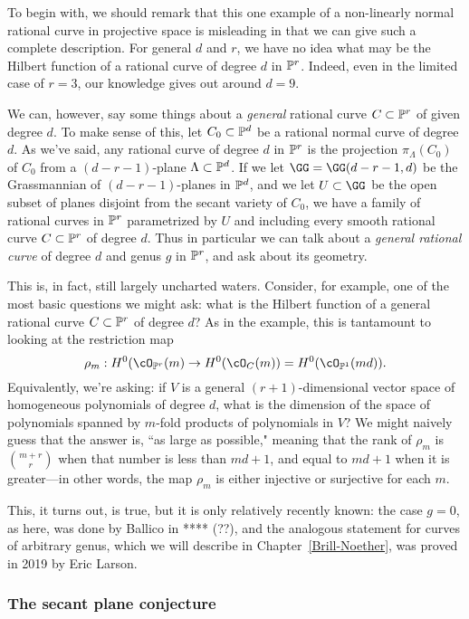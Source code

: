 To begin with, we should remark that this one example of a non-linearly normal rational curve in projective space is misleading in that we can give such a complete description. For general $d$ and $r$, we have no idea what may be the Hilbert function of a rational curve of degree $d$ in $\PP^r$. Indeed, even in the limited case of $r=3$, our knowledge gives out around $d=9$.

We can, however, say some things about a \emph{general} rational curve $C \subset \PP^r$ of given degree $d$. To make sense of this, let $C_0 \subset \PP^d$ be a rational normal curve of degree $d$. As we've said, any rational curve of degree $d$ in $\PP^r$ is the projection $\pi_\Lambda(C_0)$ of $C_0$ from a $(d-r-1)$-plane $\Lambda \subset \PP^d$. If we let $\GG = \GG(d-r-1, d)$ be the Grassmannian of $(d-r-1)$-planes in $\PP^d$, and we let $U \subset \GG$ be the open subset of planes disjoint from the secant variety of $C_0$, we have a family of rational curves in $\PP^r$ parametrized by $U$ and including every smooth rational curve $C \subset \PP^r$ of degree $d$. Thus in particular we can talk about a \emph{general rational curve} of degree $d$ and genus $g$ in $\PP^r$, and ask about its geometry.

This is, in fact, still largely uncharted waters. Consider, for example, one of the most basic questions we might ask: what is the Hilbert function of a general rational curve $C \subset \PP^r$ of degree $d$? As in the example, this is tantamount to looking at the restriction map
$$
\rho_m : H^0(\cO_{\PP^r}(m) \to H^0(\cO_C(m)) = H^0(\cO_{\PP^1}(md)).
$$
Equivalently, we're asking: if $V$ is a general  $(r+1)$-dimensional vector space of homogeneous polynomials of degree $d$, what is the dimension of the space of polynomials spanned by $m$-fold products of polynomials in $V$? We might naively guess that the answer is, ``as large as possible," meaning that the rank of $\rho_m$ is $\binom{m+r}{r}$ when that number is less than $md+1$, and equal to $md+1$ when it is greater---in other words, the map $\rho_m$ is either injective or surjective for each $m$.

This, it turns out, is true, but it is only relatively recently known: the case $g=0$, as here, was done by Ballico in **** (??), and the analogous statement for curves of arbitrary genus, which we will describe in Chapter~\ref{Brill-Noether}, was proved in 2019 by Eric Larson.

\subsubsection{The secant plane conjecture}

